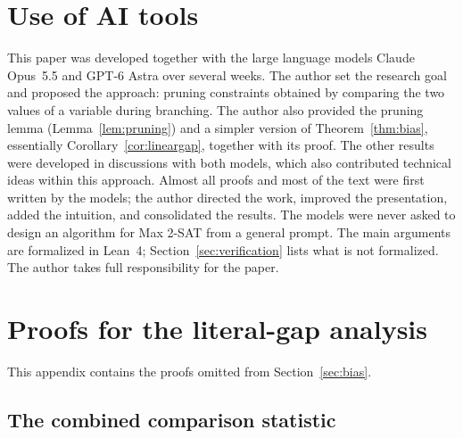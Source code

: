 \documentclass[11pt,a4paper]{article}
\theoremstyle{definition}
\theoremstyle{remark}
\begin{document}
\section*{Use of AI tools}

This paper was developed together with the large language models Claude
Opus~5.5 and GPT-6 Astra over several weeks. The author set the research
goal and proposed the approach: pruning constraints obtained by comparing
the two values of a variable during branching. The author also provided the
pruning lemma (Lemma~\ref{lem:pruning}) and a simpler version of
Theorem~\ref{thm:bias}, essentially Corollary~\ref{cor:lineargap}, together
with its proof. The other results were developed in discussions with both
models, which also contributed technical ideas within this approach. Almost
all proofs and most of the text were first written by the models; the
author directed the work, improved the presentation, added the intuition,
and consolidated the results. The models were never asked to design an
algorithm for Max 2-SAT from a general prompt. The main arguments are
formalized in Lean~4; Section~\ref{sec:verification} lists what is not
formalized. The author takes full responsibility for the paper.

{\small
	
	
}

\newpage
\appendix


\section{Proofs for the literal-gap analysis}\label{app:bias}

This appendix contains the proofs omitted from Section~\ref{sec:bias}.

\subsection{The combined comparison statistic}\label{app:bias_statistics_proof}
\end{document}
